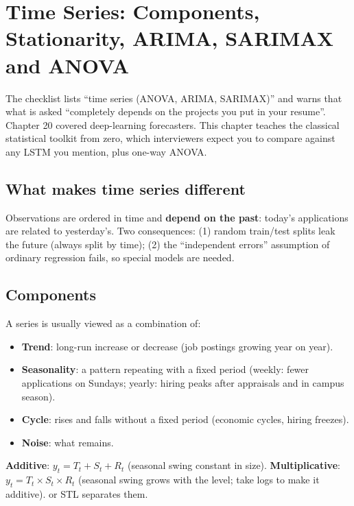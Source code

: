 \chapter{Time Series: Components, Stationarity, ARIMA, SARIMAX and ANOVA}

The checklist lists ``time series (ANOVA, ARIMA, SARIMAX)'' and warns that what is asked ``completely depends on the projects you put in your resume''.
Chapter 20 covered deep-learning forecasters. This chapter teaches the classical statistical toolkit from zero, which interviewers expect you to
compare against any LSTM you mention, plus one-way ANOVA.

\section{What makes time series different}
Observations are ordered in time and \textbf{depend on the past}: today's applications are related to yesterday's. Two consequences: (1) random train/test
splits leak the future (always split by time); (2) the ``independent errors'' assumption of ordinary regression fails, so special models are needed.

\section{Components}
A series is usually viewed as a combination of:
\begin{itemize}
\item \textbf{Trend}: long-run increase or decrease (job postings growing year on year).
\item \textbf{Seasonality}: a pattern repeating with a fixed period (weekly: fewer applications on Sundays; yearly: hiring peaks after appraisals and in campus season).
\item \textbf{Cycle}: rises and falls without a fixed period (economic cycles, hiring freezes).
\item \textbf{Noise}: what remains.
\end{itemize}
\textbf{Additive}: $y_t = T_t + S_t + R_t$ (seasonal swing constant in size). \textbf{Multiplicative}: $y_t = T_t\times S_t\times R_t$ (seasonal swing grows with the level; take logs to
make it additive).  or STL separates them.

